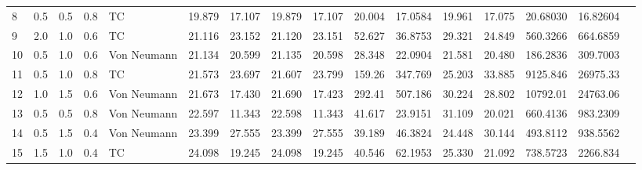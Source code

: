 \begin{tabular}{lrrrllrrrrrrrrrr}
8  & 0.5   & 0.5   & 0.8 & TC          & 19.879                                    & 17.107                             & 19.879                            & 17.107                              & 20.004 & 17.0584  & 19.961 & 17.075   & 20.68030 & 16.82604 \\
9  & 2.0   & 1.0   & 0.6 & TC          & 21.116                                    & 23.152                             & 21.120                            & 23.151                              & 52.627 & 36.8753  & 29.321 & 24.849   & 560.3266 & 664.6859 \\
10  & 0.5   & 1.0   & 0.6 & Von Neumann & 21.134                                    & 20.599                             & 21.135                            & 20.598                              & 28.348 & 22.0904  & 21.581 & 20.480   & 186.2836 & 309.7003 \\
11 & 0.5   & 1.0   & 0.8 & TC          & 21.573                                    & 23.697                             & 21.607                            & 23.799                              & 159.26 & 347.769  & 25.203 & 33.885   & 9125.846 & 26975.33 \\
12 & 1.0   & 1.5   & 0.6 & Von Neumann & 21.673                                    & 17.430                             & 21.690                            & 17.423                              & 292.41 & 507.186  & 30.224 & 28.802   & 10792.01 & 24763.06 \\
13 & 0.5   & 0.5   & 0.8 & Von Neumann & 22.597                                    & 11.343                             & 22.598                            & 11.343                              & 41.617 & 23.9151  & 31.109 & 20.021   & 660.4136 & 983.2309 \\
14 & 0.5   & 1.5   & 0.4 & Von Neumann & 23.399                                    & 27.555                             & 23.399                            & 27.555                              & 39.189 & 46.3824  & 24.448 & 30.144   & 493.8112 & 938.5562 \\
15 & 1.5   & 1.0   & 0.4 & TC          & 24.098                                    & 19.245                             & 24.098                            & 19.245                              & 40.546 & 62.1953  & 25.330 & 21.092   & 738.5723 & 2266.834 \\
\bottomrule
\end{tabular}
